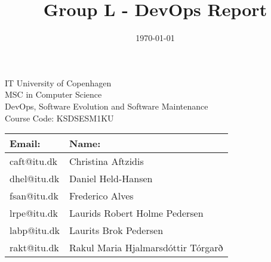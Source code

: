 \documentclass{article}
\title{Group L - DevOps Report}
\author{ }
\date{\today}
\begin{document}
\maketitle
\begin{center}
    IT University of Copenhagen \\
    MSC in Computer Science \\
    DevOps, Software Evolution and Software Maintenance \\ 
    Course Code: KSDSESM1KU \\
\end{center}

\begin{table}[h]
    \begin{center}
        \begin{tabular*}{1\textwidth}{l l}
        \toprule
        Email: & Name: \\
        \midrule
        {caft@itu.dk} & {Christina Aftzidis} \\
        {dhel@itu.dk} & {Daniel Held-Hansen} \\
        {fsan@itu.dk} & {Frederico Alves} \\
        {lrpe@itu.dk} & {Laurids Robert Holme Pedersen} \\
        {labp@itu.dk} & {Laurits Brok Pedersen} \\
        {rakt@itu.dk} & {Rakul Maria Hjalmarsdóttir Tórgarð} \\
        \bottomrule
        \end{tabular*}
    \end{center}
\end{table}
\newpage
\tableofcontents
\newpage





\newpage
 
\newpage

\end{document}
